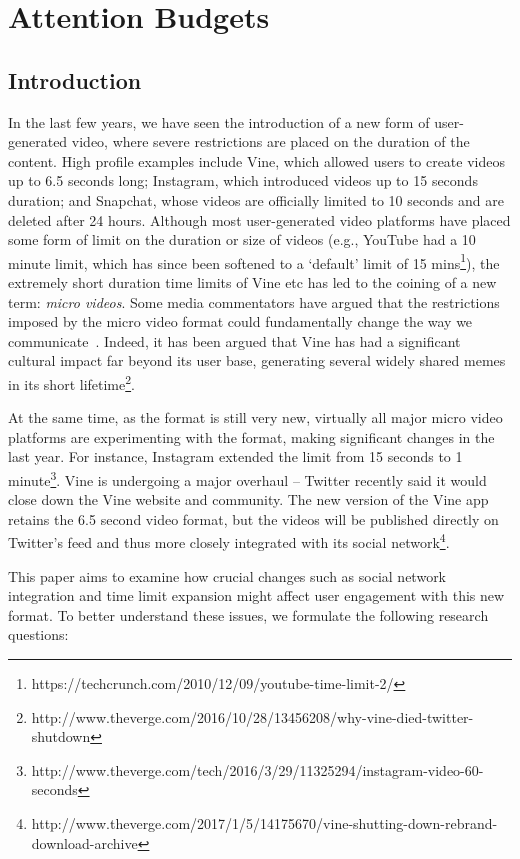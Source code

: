 
\chapter{Attention Budgets}

\graphicspath{{Chapter2/plots/}}
\section{Introduction}
In the last few years, we have seen the introduction of a new form of user-generated video, where severe restrictions are placed on the duration of the content. High profile examples include Vine, which allowed users to create videos up to 6.5 seconds long;  Instagram, which introduced videos up to 15 seconds duration; and Snapchat, whose videos are officially limited to 10 seconds and are deleted after 24 hours. 
Although most user-generated video platforms have placed some form of limit on the duration or size of videos (e.g., YouTube had a 10 minute limit, which has since been softened to a `default' limit of 15 mins\footnote{\scriptsize https://techcrunch.com/2010/12/09/youtube-time-limit-2/}), the extremely short duration time limits of Vine etc has led to the coining of a new term: \emph{micro videos}. Some media commentators have argued that the restrictions imposed by the micro video format could fundamentally change the way we communicate~\cite{bbc}. Indeed, it has been argued that Vine has had a significant cultural impact far beyond its user base, generating several widely shared memes in its short lifetime\footnote{\scriptsize http://www.theverge.com/2016/10/28/13456208/why-vine-died-twitter-shutdown}. 


At the same time, as the format is still very new, virtually all major micro video platforms are experimenting with the format, making significant changes in the last year. For instance, Instagram extended the limit from 15 seconds to 1 minute\footnote{\scriptsize http://www.theverge.com/tech/2016/3/29/11325294/instagram-video-60-seconds}. Vine is undergoing a major overhaul -- Twitter recently said it would close down the Vine website and community. The new version of the Vine app retains the 6.5 second video format, but the videos will be published directly on Twitter's feed and thus more closely integrated with its social network\footnote{\scriptsize http://www.theverge.com/2017/1/5/14175670/vine-shutting-down-rebrand-download-archive}. 

This paper aims to examine how  crucial changes such as social network integration and time limit expansion might affect user engagement with this new format. 
To better understand these issues, we formulate the following research questions: 

